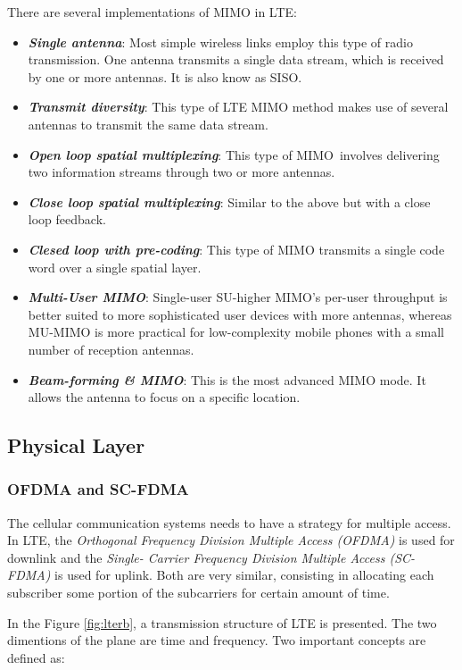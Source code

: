 There are several implementations of MIMO in LTE:
\begin{itemize}[topsep=0pt]
  \item \textbf{\textit{Single antenna}}: Most simple wireless links employ this type of radio 
  transmission. One antenna transmits a single data stream, which is received by one or more 
  antennas. It is also know as SISO.
  \item \textbf{\textit{Transmit diversity}}: This type of LTE MIMO method makes use of several 
  antennas to transmit the same data stream.
  \item \textbf{\textit{Open loop spatial multiplexing}}: This type of MIMO involves delivering 
  two information streams through two or more antennas.
  \item \textbf{\textit{Close loop spatial multiplexing}}: Similar to the above but with a close 
  loop feedback.
  \item \textbf{\textit{Clesed loop with pre-coding}}: This type of MIMO transmits a single code word 
  over a single spatial layer.
  \item \textbf{\textit{Multi-User MIMO}}: Single-user SU-higher MIMO's per-user throughput is better 
  suited to more sophisticated user devices with more antennas, whereas MU-MIMO is more practical
  for low-complexity mobile phones with a small number of reception antennas.
  \item \textbf{\textit{Beam-forming \& MIMO}}: This is the most advanced MIMO mode. It allows
   the antenna to focus on a specific location.

\end{itemize}

\subsection{Physical Layer}

\subsubsection{OFDMA and SC-FDMA}
The cellular communication systems needs to have a strategy for multiple access. In LTE, the 
\textit{Orthogonal Frequency Division Multiple Access (OFDMA)} is used for downlink and the \textit{Single-
Carrier Frequency Division Multiple Access (SC-FDMA)} is used for uplink. Both are very similar, consisting
in allocating each subscriber some portion of the subcarriers for certain amount of time.

In the Figure \ref{fig:lterb}, a transmission structure of LTE is presented. The two dimentions of the 
plane are time and frequency. Two important concepts are defined as:

